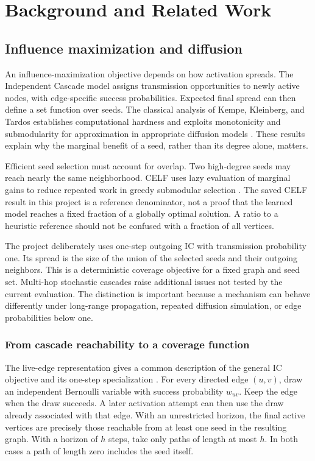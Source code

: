 \chapter{Background and Related Work}\label{ch:related}
\section{Influence maximization and diffusion}
An influence-maximization objective depends on how activation spreads. The Independent Cascade model assigns transmission opportunities to newly active nodes, with edge-specific success probabilities. Expected final spread can then define a set function over seeds. The classical analysis of Kempe, Kleinberg, and Tardos establishes computational hardness and exploits monotonicity and submodularity for approximation in appropriate diffusion models \cite{kempe2003}. These results explain why the marginal benefit of a seed, rather than its degree alone, matters.

Efficient seed selection must account for overlap. Two high-degree seeds may reach nearly the same neighborhood. CELF uses lazy evaluation of marginal gains to reduce repeated work in greedy submodular selection \cite{leskovec2007}. The saved CELF result in this project is a reference denominator, not a proof that the learned model reaches a fixed fraction of a globally optimal solution. A ratio to a heuristic reference should not be confused with a fraction of all vertices.

The project deliberately uses one-step outgoing IC with transmission probability one. Its spread is the size of the union of the selected seeds and their outgoing neighbors. This is a deterministic coverage objective for a fixed graph and seed set. Multi-hop stochastic cascades raise additional issues not tested by the current evaluation. The distinction is important because a mechanism can behave differently under long-range propagation, repeated diffusion simulation, or edge probabilities below one.

\subsection{From cascade reachability to a coverage function}
The live-edge representation gives a common description of the general IC objective and its one-step specialization \cite{kempe2003,hou2025}. For every directed edge $(u,v)$, draw an independent Bernoulli variable with success probability $w_{uv}$. Keep the edge when the draw succeeds. A later activation attempt can then use the draw already associated with that edge. With an unrestricted horizon, the final active vertices are precisely those reachable from at least one seed in the resulting graph. With a horizon of $h$ steps, take only paths of length at most $h$. In both cases a path of length zero includes the seed itself.

